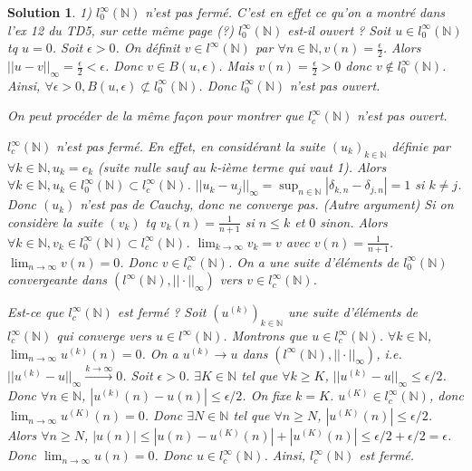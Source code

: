 \documentclass{article}
\newtheorem{solution}{Solution}
\begin{document}
\begin{solution}
1) $l_0^{\infty}(\mathbb{N})$ n'est pas fermé. C'est en effet ce qu'on a montré dans l'ex 12 du TD5, sur cette même page (?)
$l_0^{\infty}(\mathbb{N})$ est-il ouvert ?
Soit $u \in l_0^{\infty}(\mathbb{N})$ tq $u=0$.
Soit $\epsilon > 0$. On définit $v \in l^{\infty}(\mathbb{N})$ par $\forall n \in \mathbb{N}, v(n) = \frac{\epsilon}{2}$.
Alors $||u-v||_{\infty} = \frac{\epsilon}{2} < \epsilon$. Donc $v \in B(u, \epsilon)$.
Mais $v(n) = \frac{\epsilon}{2} > 0$ donc $v \notin l_0^{\infty}(\mathbb{N})$.
Ainsi, $\forall \epsilon > 0, B(u, \epsilon) \not\subset l_0^{\infty}(\mathbb{N})$.
Donc $l_0^{\infty}(\mathbb{N})$ n'est pas ouvert.

On peut procéder de la même façon pour montrer que $l_c^{\infty}(\mathbb{N})$ n'est pas ouvert.

$l_c^{\infty}(\mathbb{N})$ n'est pas fermé. En effet, en considérant la suite $(u_k)_{k \in \mathbb{N}}$ définie par $\forall k \in \mathbb{N}, u_k = e_k$ (suite nulle sauf au $k$-ième terme qui vaut 1).
Alors $\forall k \in \mathbb{N}, u_k \in l_0^{\infty}(\mathbb{N}) \subset l_c^{\infty}(\mathbb{N})$.
$||u_k - u_j||_\infty = \sup_{n \in \mathbb{N}} | \delta_{k,n} - \delta_{j,n} | = 1$ si $k \ne j$.
Donc $(u_k)$ n'est pas de Cauchy, donc ne converge pas.
(Autre argument) Si on considère la suite $(v_k)$ tq $v_k(n) = \frac{1}{n+1}$ si $n \le k$ et $0$ sinon.
Alors $\forall k \in \mathbb{N}, v_k \in l_0^{\infty}(\mathbb{N}) \subset l_c^{\infty}(\mathbb{N})$.
$\lim_{k \to \infty} v_k = v$ avec $v(n) = \frac{1}{n+1}$.
$\lim_{n \to \infty} v(n) = 0$. Donc $v \in l_c^{\infty}(\mathbb{N})$.
On a une suite d'éléments de $l_0^{\infty}(\mathbb{N})$ convergeante dans $(l^\infty(\mathbb{N}), ||\cdot||_\infty)$ vers $v \in l_c^{\infty}(\mathbb{N})$.

Est-ce que $l_c^{\infty}(\mathbb{N})$ est fermé ?
Soit $(u^{(k)})_{k \in \mathbb{N}}$ une suite d'éléments de $l_c^{\infty}(\mathbb{N})$ qui converge vers $u \in l^\infty(\mathbb{N})$. Montrons que $u \in l_c^{\infty}(\mathbb{N})$.
$\forall k \in \mathbb{N}$, $\lim_{n \to \infty} u^{(k)}(n) = 0$.
On a $u^{(k)} \to u$ dans $(l^\infty(\mathbb{N}), ||\cdot||_\infty)$, i.e. $||u^{(k)} - u||_\infty \xrightarrow{k \to \infty} 0$.
Soit $\epsilon > 0$.
$\exists K \in \mathbb{N}$ tel que $\forall k \ge K$, $||u^{(k)} - u||_\infty \le \epsilon/2$.
Donc $\forall n \in \mathbb{N}$, $|u^{(k)}(n) - u(n)| \le \epsilon/2$.
On fixe $k=K$. $u^{(K)} \in l_c^{\infty}(\mathbb{N})$, donc $\lim_{n \to \infty} u^{(K)}(n) = 0$.
Donc $\exists N \in \mathbb{N}$ tel que $\forall n \ge N$, $|u^{(K)}(n)| \le \epsilon/2$.
Alors $\forall n \ge N$, $|u(n)| \le |u(n) - u^{(K)}(n)| + |u^{(K)}(n)| \le \epsilon/2 + \epsilon/2 = \epsilon$.
Donc $\lim_{n \to \infty} u(n) = 0$.
Donc $u \in l_c^{\infty}(\mathbb{N})$.
Ainsi, $l_c^{\infty}(\mathbb{N})$ est fermé.


\end{solution}
\end{document}
